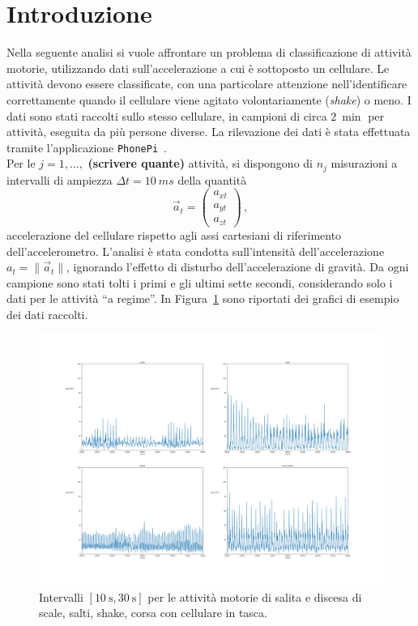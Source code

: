 \documentclass[./main.tex]{subfiles}
\begin{document}
\section{Introduzione}
Nella seguente analisi si vuole affrontare un problema di classificazione di attività motorie, utilizzando dati sull'accelerazione a cui è sottoposto un cellulare. Le attività devono essere classificate, con una particolare attenzione nell'identificare correttamente quando il cellulare viene agitato volontariamente ({\em shake}) o meno. I dati sono stati raccolti sullo stesso cellulare, in campioni di circa $\SI{2}{\min}$ per attività, eseguita da più persone diverse. La rilevazione dei dati è stata effettuata tramite l'applicazione \texttt{PhonePi}~\cite{kumar2019}.\\
Per le $j = 1, \ldots, $ \textbf{(scrivere quante)} attività, si dispongono di $n_j$ misurazioni a intervalli di ampiezza $\Delta t = \SI{10}{ms}$ della quantità
$$
\vec{a}_t = \begin{pmatrix}
a_{xt}\\
a_{yt}\\
a_{zt}
\end{pmatrix}\,,
$$
accelerazione del cellulare rispetto agli assi cartesiani di riferimento dell'accelerometro. L'analisi è stata condotta sull'intensità dell'accelerazione $a_t = \|\vec{a}_t\|$, ignorando l'effetto di disturbo dell'accelerazione di gravità. Da ogni campione sono stati tolti i primi e gli ultimi sette secondi, considerando solo i dati per le attività ``a regime''.
In Figura~\ref{fig:esempio} sono riportati dei grafici di esempio dei dati raccolti.
\begin{figure}[H]
	\label{fig:esempio}
	\centering
	\includegraphics[width=.8\textwidth, keepaspectratio]{../../figure/espl.png}
	\caption{Intervalli $ [\SI{10}{\second}, \SI{30}{\second}] $ per le attività motorie di salita e discesa di scale, salti, shake, corsa con cellulare in tasca.}
\end{figure}
\end{document}
